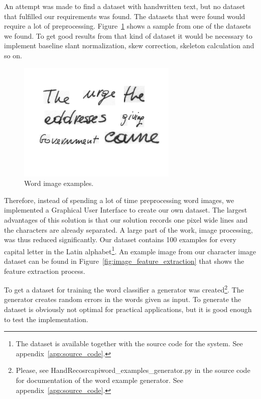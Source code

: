 
An attempt was made to find a dataset with handwritten text, but no dataset that fulfilled our requirements was found.
The datasets that were found would require a lot of preprocessing. 
Figure~\ref{figure:wordsexamples} shows a sample from one of the datasets we found.
To get good results from that kind of dataset it would be necessary to implement baseline slant normalization, skew correction, skeleton calculation and so on.

\begin{figure}[h!]
\centering
 \includegraphics[width=3in]{datasets_examples}
\caption{Word image examples.}
\label{figure:wordsexamples}
\end{figure}

Therefore, instead of spending a lot of time preprocessing word images, we implemented a Graphical User Interface to create our own dataset.
The largest advantages of this solution is that our solution records one pixel wide lines and the characters are already separated. 
A large part of the work, image processing, was thus reduced significantly.
Our dataset contains 100 examples for every capital letter in the Latin alphabet\footnote{The dataset is available together with the source code for the system. See appendix~\ref{app:source_code}.}.
An example image from our character image dataset can be found in Figure~\ref{fig:image_feature_extraction} that shows the feature extraction process.

To get a dataset for training the word classifier a generator was created\footnote{Please, see HandReco\/src\/api\/word\_examples\_generator.py in the source code for documentation of the word example generator. See appendix~\ref{app:source_code}.}.
The generator creates random errors in the words given as input.
To generate the dataset is obviously not optimal for practical applications, but it is good enough to test the implementation.
